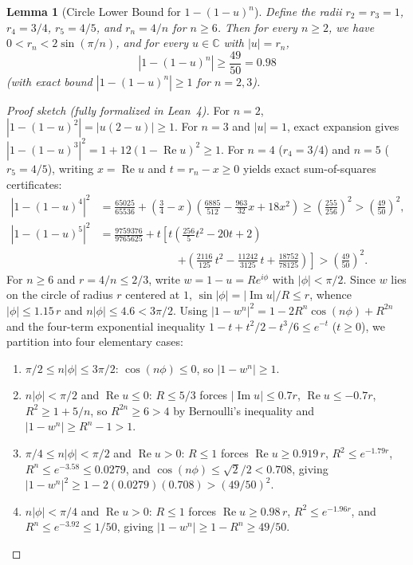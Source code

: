 \documentclass[11pt,a4paper]{article}
\newtheorem{lemma}[theorem]{Lemma}
\theoremstyle{definition}
\theoremstyle{remark}
\newcommand{\CC}{\mathbb{C}}
\DeclareMathOperator{\RePart}{Re}
\DeclareMathOperator{\ImPart}{Im}
\begin{document}
\begin{lemma}[Circle Lower Bound for $1 - (1 - u)^n$]
\label{lem:circle-bound}
Define the radii $r_2 = r_3 = 1$, $r_4 = 3/4$, $r_5 = 4/5$, and $r_n = 4/n$ for $n \ge 6$. Then for every $n \ge 2$, we have $0 < r_n < 2\sin(\pi/n)$, and for every $u \in \CC$ with $|u| = r_n$,
\[
|1 - (1 - u)^n| \ge \frac{49}{50} = 0.98
\]
(with exact bound $|1 - (1 - u)^n| \ge 1$ for $n = 2, 3$).
\end{lemma}

\begin{proof}[Proof sketch (fully formalized in Lean~4)]
For $n = 2$, $|1 - (1 - u)^2| = |u(2 - u)| \ge 1$. For $n = 3$ and $|u| = 1$, exact expansion gives $|1 - (1 - u)^3|^2 = 1 + 12(1 - \RePart u)^2 \ge 1$. For $n = 4$ ($r_4 = 3/4$) and $n = 5$ ($r_5 = 4/5$), writing $x = \RePart u$ and $t = r_n - x \ge 0$ yields exact sum-of-squares certificates:
\begin{align*}
|1 - (1 - u)^4|^2 &= \frac{65025}{65536} + \left(\frac{3}{4} - x\right)\!\left(\frac{6885}{512} - \frac{963}{32} x + 18 x^2\right) \ge \left(\frac{255}{256}\right)^2 > \left(\frac{49}{50}\right)^2, \\
|1 - (1 - u)^5|^2 &= \frac{9759376}{9765625} + t\left[t\!\left(\frac{256}{5}t^2 - 20t + 2\right) \right. \\
&\qquad\qquad\qquad\quad \left. + \left(\frac{2116}{125}\, t^2 - \frac{11242}{3125}\,t + \frac{18752}{78125}\right)\right] > \left(\frac{49}{50}\right)^2.
\end{align*}
For $n \ge 6$ and $r = 4/n \le 2/3$, write $w = 1 - u = R e^{i\phi}$ with $|\phi| < \pi/2$. Since $w$ lies on the circle of radius $r$ centered at $1$, $\sin|\phi| = |\ImPart u|/R \le r$, whence $|\phi| \le 1.15\,r$ and $n|\phi| \le 4.6 < 3\pi/2$. Using $|1 - w^n|^2 = 1 - 2 R^n \cos(n\phi) + R^{2n}$ and the four-term exponential inequality $1 - t + t^2/2 - t^3/6 \le e^{-t}$ ($t \ge 0$), we partition into four elementary cases:
\begin{enumerate}
\item $\pi/2 \le n|\phi| \le 3\pi/2$: $\cos(n\phi) \le 0$, so $|1 - w^n| \ge 1$.
\item $n|\phi| < \pi/2$ and $\RePart u \le 0$: $R \le 5/3$ forces $|\ImPart u| \le 0.7r$, $\RePart u \le -0.7r$, $R^2 \ge 1 + 5/n$, so $R^{2n} \ge 6 > 4$ by Bernoulli's inequality and $|1 - w^n| \ge R^n - 1 > 1$.
\item $\pi/4 \le n|\phi| < \pi/2$ and $\RePart u > 0$: $R \le 1$ forces $\RePart u \ge 0.919\,r$, $R^2 \le e^{-1.79 r}$, $R^n \le e^{-3.58} \le 0.0279$, and $\cos(n\phi) \le \sqrt{2}/2 < 0.708$, giving $|1 - w^n|^2 \ge 1 - 2(0.0279)(0.708) > (49/50)^2$.
\item $n|\phi| < \pi/4$ and $\RePart u > 0$: $R \le 1$ forces $\RePart u \ge 0.98\,r$, $R^2 \le e^{-1.96 r}$, and $R^n \le e^{-3.92} \le 1/50$, giving $|1 - w^n| \ge 1 - R^n \ge 49/50$. \qedhere
\end{enumerate}
\end{proof}
\end{document}
